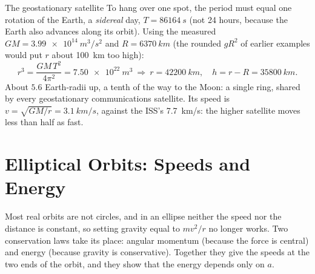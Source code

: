 \begin{figure}[htbp]
\centering
{}
\end{figure}


\begin{exbox}{The geostationary satellite}
To hang over one spot, the period must equal one rotation of the Earth, a \emph{sidereal} day,
$T=\SI{86164}{s}$ (not 24 hours, because the Earth also advances along its orbit). Using the measured
$GM=\SI{3.99e14}{m^3/s^2}$ and $R=\SI{6370}{km}$ (the rounded $gR^2$ of earlier examples would put $r$
about \SI{100}{km} too high):
\[
r^3=\frac{GM\,T^2}{4\pi^2}=\SI{7.50e22}{m^3}\ \Rightarrow\ r=\SI{42200}{km},\quad h=r-R=\SI{35800}{km}.
\]
About $5.6$ Earth-radii up, a tenth of the way to the Moon: a single ring, shared by every
geostationary communications satellite. Its speed is
$v=\sqrt{GM/r}=\SI{3.1}{km/s}$, against the ISS's \SI{7.7}{km/s}: the higher satellite moves less than
half as fast. 
\end{exbox}

\section{Elliptical Orbits: Speeds and Energy}\label{sec:ellipticorbits}

Most real orbits are not circles, and in an ellipse neither the speed nor the distance is constant, so
setting gravity equal to $mv^2/r$ no longer works. Two conservation laws take its place: angular
momentum (because the force is central) and energy (because gravity is conservative). Together they
give the speeds at the two ends of the orbit, and they show that the energy depends only on $a$.

